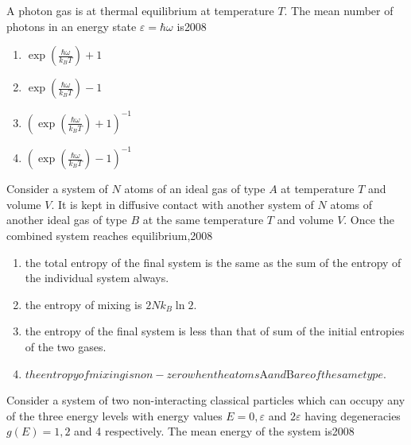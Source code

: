     \item  A photon gas is at thermal equilibrium at temperature $T$. The mean number of photons in an energy state $\varepsilon=\hbar \omega$ is\hfill{2008}
    \begin{multicols}{4}
            \begin{enumerate}
              \item  $\exp (\frac{\hbar \omega}{k_{B} T})+1$
              \item $\exp (\frac{\hbar \omega}{k_{B} T})-1$
              \item $(\exp (\frac{\hbar \omega}{k_{B} T})+1)^{-1}$
              \item  $(\exp(\frac{\hbar \omega}{k_{B} T})-1)^{-1}$
            \end{enumerate}
        \end{multicols}
    
    

    \item  Consider a system of $N$ atoms of an ideal gas of type $A$ at temperature $T$ and volume $V$. It is kept in diffusive contact with another system of $N$ atoms of another ideal gas of type $B$ at the same temperature $T$ and volume $V$. Once the combined system reaches equilibrium,\hfill{2008}
   
            \begin{enumerate}
            \item the total entropy of the final system is the same as the sum of the entropy of the individual system always.
            \item the entropy of mixing is $2 N k_{B} \ln 2$.
            \item  the entropy of the final system is less than that of sum of the initial entropies of the two gases.
            \item $the entropy of mixing is non-zero when the atoms $A$ and $B$ are of the same type.$
            \end{enumerate}
       
    \item   Consider a system of two non-interacting classical particles which can occupy any of the three energy levels with energy values $E=0, \varepsilon$ and $2 \varepsilon$ having degeneracies $g(E)=1,2$ and 4 respectively. The mean energy of the system is\hfill{2008}
    
